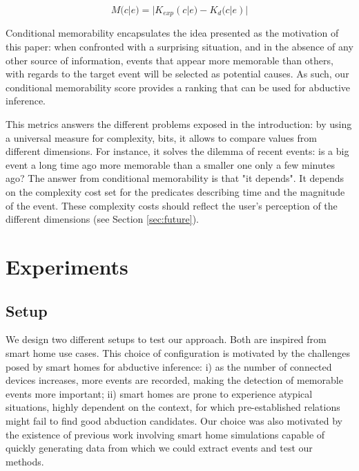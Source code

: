 \documentclass[entropy,article,submit,moreauthors,pdftex]{Definitions/mdpi}
\begin{document}
\begin{equation}
    \label{eq:cond_mem}
    M(c|e) = |K_{exp}(c|e) - K_d(c|e)|
\end{equation}

Conditional memorability encapsulates the idea
presented as the motivation of this paper: when confronted with a surprising
situation, and in the absence of any other source of information, events that appear more memorable than others, with regards to the target event will be selected as potential causes. As such, our conditional memorability score provides a ranking that can be used for abductive inference.

This metrics answers the different problems exposed in the introduction: by using a universal measure for complexity, bits, it allows to compare values from different dimensions. For instance, it solves the dilemma of recent events: is a big event a long time ago more memorable than a smaller one only a few minutes ago? The answer from conditional memorability is that "it depends". It depends on the complexity cost set for the predicates describing time and the magnitude of the event. These complexity costs should reflect the user's perception of the different dimensions (see Section \ref{sec:future}).


\section{Experiments}
\label{sec:results}
\subsection{Setup}

We design two different setups to test our approach. Both are inspired from smart home use cases.  This choice of
configuration is motivated by the challenges posed by smart homes for abductive
inference: i) as the number of connected devices increases, more events are
recorded, making the detection of memorable events more important; ii) smart
homes are prone to experience atypical situations, highly dependent on the context,
for which pre-established relations might fail to find good abduction
candidates. Our choice was also motivated by
the existence of previous work\cite{lalanda_self-aware_2017} involving smart home simulations capable of quickly generating data from which we could extract events and test our methods.
\end{document}

